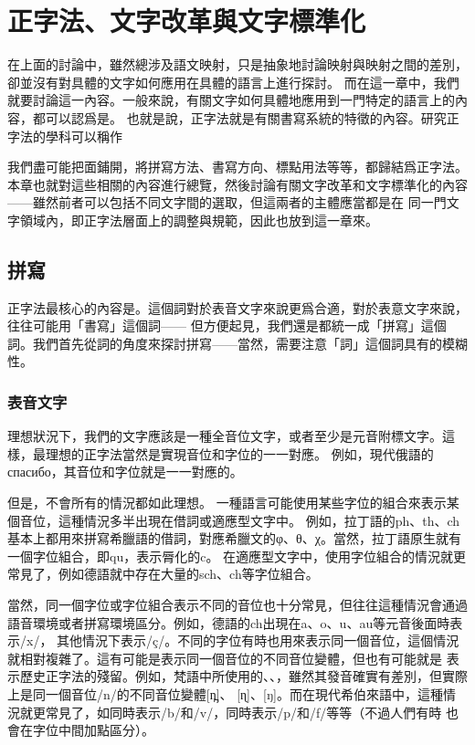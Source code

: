 \section{正字法、文字改革與文字標準化}
在上面的討論中，雖然總涉及語文映射，只是抽象地討論映射與映射之間的差別，卻並沒有對具體的文字如何應用在具體的語言上進行探討。
而在這一章中，我們就要討論這一內容。一般來說，有關文字如何具體地應用到一門特定的語言上的內容，都可以認爲是。
也就是說，正字法就是有關書寫系統的特徵的內容。研究正字法的學科可以稱作

我們盡可能把面鋪開，將拼寫方法、書寫方向、標點用法等等，都歸結爲正字法。
本章也就對這些相關的內容進行總覽，然後討論有關文字改革和文字標準化的內容——雖然前者可以包括不同文字間的選取，但這兩者的主體應當都是在
同一門文字領域內，即正字法層面上的調整與規範，因此也放到這一章來。

\subsection{拼寫}
正字法最核心的內容是。這個詞對於表音文字來說更爲合適，對於表意文字來說，往往可能用「書寫」這個詞——
但方便起見，我們還是都統一成「拼寫」這個詞。我們首先從詞的角度來探討拼寫——當然，需要注意「詞」這個詞具有的模糊性。

\subsubsection*{表音文字}
理想狀況下，我們的文字應該是一種全音位文字，或者至少是元音附標文字。這樣，最理想的正字法當然是實現音位和字位的一一對應。
例如，現代俄語的спасибо，其音位和字位就是一一對應的。

但是，不會所有的情況都如此理想。
一種語言可能使用某些字位的組合來表示某個音位，這種情況多半出現在借詞或適應型文字中。
例如，拉丁語的ph、th、ch基本上都用來拼寫希臘語的借詞，對應希臘文的φ、θ、χ。當然，拉丁語原生就有一個字位組合，即qu，表示脣化的c。
在適應型文字中，使用字位組合的情況就更常見了，例如德語就中存在大量的sch、ch等字位組合。

當然，同一個字位或字位組合表示不同的音位也十分常見，但往往這種情況會通過語音環境或者拼寫環境區分。例如，德語的ch出現在a、o、u、au等元音後面時表示/x/，
其他情況下表示/ç/。不同的字位有時也用來表示同一個音位，這個情況就相對複雜了。這有可能是表示同一個音位的不同音位變體，但也有可能就是
表示歷史正字法的殘留。例如，梵語中所使用的、、，雖然其發音確實有差別，但實際上是同一個音位/n/的不同音位變體[n̪]、
[ɳ]、[ŋ]。而在現代希伯來語中，這種情況就更常見了，如同時表示/b/和/v/，同時表示/p/和/f/等等（不過人們有時
也會在字位中間加點區分）。 

